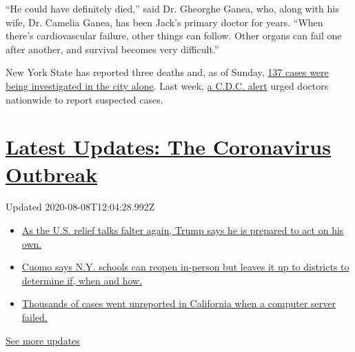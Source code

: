 ``He could have definitely died,'' said Dr. Gheorghe Ganea, who, along
with his wife, Dr. Camelia Ganea, has been Jack's primary doctor for
years. ``When there's cardiovascular failure, other things can follow.
Other organs can fail one after another, and survival becomes very
difficult.''

New York State has reported three deaths and, as of Sunday,
\href{https://www.nytimes.com/2020/05/17/nyregion/coronavirus-new-york-update.html}{137
cases were being investigated in the city alone}. Last week,
\href{https://emergency.cdc.gov/han/2020/han00432.asp}{a C.D.C. alert}
urged doctors nationwide to report suspected cases.

\hypertarget{latest-updates-the-coronavirus-outbreak}{%
\section{\texorpdfstring{\href{https://www.nytimes.com/2020/08/07/world/covid-19-news.html?action=click\&pgtype=Article\&state=default\&region=MAIN_CONTENT_1\&context=storylines_live_updates}{Latest
Updates: The Coronavirus
Outbreak}}{Latest Updates: The Coronavirus Outbreak}}\label{latest-updates-the-coronavirus-outbreak}}

Updated 2020-08-08T12:04:28.992Z

\begin{itemize}
\tightlist
\item
  \href{https://www.nytimes.com/2020/08/07/world/covid-19-news.html?action=click\&pgtype=Article\&state=default\&region=MAIN_CONTENT_1\&context=storylines_live_updates\#link-1f86d03a}{As
  the U.S. relief talks falter again, Trump says he is prepared to act
  on his own.}
\item
  \href{https://www.nytimes.com/2020/08/07/world/covid-19-news.html?action=click\&pgtype=Article\&state=default\&region=MAIN_CONTENT_1\&context=storylines_live_updates\#link-3f64a70a}{Cuomo
  says N.Y. schools can reopen in-person but leaves it up to districts
  to determine if, when and how.}
\item
  \href{https://www.nytimes.com/2020/08/07/world/covid-19-news.html?action=click\&pgtype=Article\&state=default\&region=MAIN_CONTENT_1\&context=storylines_live_updates\#link-14e70066}{Thousands
  of cases went unreported in California when a computer server failed.}
\end{itemize}

\href{https://www.nytimes.com/2020/08/07/world/covid-19-news.html?action=click\&pgtype=Article\&state=default\&region=MAIN_CONTENT_1\&context=storylines_live_updates}{See
more updates}

